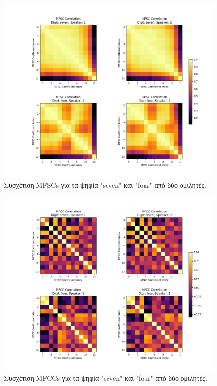 \documentclass[a4paper,12pt]{article}
\begin{document}
\begin{figure}[h]
  \centering
  \includegraphics[width=\textwidth]{images/corr_mfsc_combined.png}
  \caption{Συσχέτιση MFSCs για τα ψηφία "seven" και "four" από δύο ομιλητές.}
  \label{fig:mfsc_correlation}
\end{figure}

\begin{figure}[h]
  \centering
  \includegraphics[width=\textwidth]{images/corr_mfcc_combined.png}
  \caption{Συσχέτιση MFCCs για τα ψηφία "seven" και "four" από δύο ομιλητές.}
  \label{fig:mfcc_correlation}
\end{figure}
\end{document}
